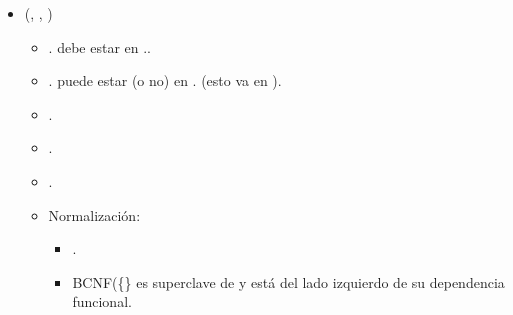 \begin{itemize}
    \item {}(, ,
          )
          \begin{itemize}
              \item {}. debe estar en
                    ..
              \item {}. puede estar (o no) en
                    . (esto va en ).
              \item {}.
              \item {}.
              \item {}.
              \item Normalización:
                    \begin{itemize}
                        \item {}.
                        \item BCNF(\{\} es superclave de  y está del lado izquierdo
                              de su dependencia funcional.
                    \end{itemize}
          \end{itemize}


\end{itemize}
